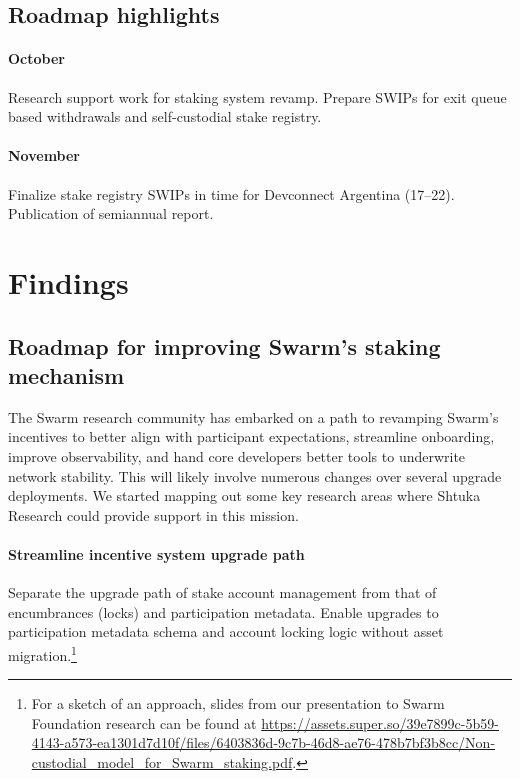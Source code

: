\subsection*{Roadmap highlights}

\paragraph{October}
%
Research support work for staking system revamp.  
%
Prepare SWIPs for exit queue based withdrawals and self-custodial stake registry.

\paragraph{November}
%
Finalize stake registry SWIPs in time for Devconnect Argentina (17--22).
%
Publication of semiannual report.


\section*{Findings}

\subsection*{Roadmap for improving Swarm's staking mechanism}

The Swarm research community has embarked on a path to revamping Swarm's incentives to better align with participant expectations, streamline onboarding, improve observability, and hand core developers better tools to underwrite network stability.
%
This will likely involve numerous changes over several upgrade deployments.
%
We started mapping out some key research areas where Shtuka Research could provide support in this mission.

\paragraph{Streamline incentive system upgrade path}
    Separate the upgrade path of stake account management from that of encumbrances (locks) and participation metadata.
    Enable upgrades to participation metadata schema and account locking logic without asset migration.\footnote{For a sketch of an approach, slides from our presentation to Swarm Foundation research can be found at \url{https://assets.super.so/39e7899c-5b59-4143-a573-ea1301d7d10f/files/6403836d-9c7b-46d8-ae76-478b7bf3b8cc/Non-custodial_model_for_Swarm_staking.pdf}.}

